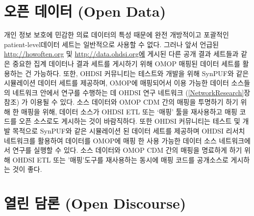 \documentclass[11pt]{book}
\theoremstyle{definition}
\theoremstyle{definition}
\theoremstyle{definition}
\theoremstyle{remark}
\begin{document}
\section{오픈 데이터 (Open Data)}\label{--open-data}


개인 정보 보호에 민감한 의료 데이터의 특성 때문에 완전 개방적이고
포괄적인 patient-level데이터 세트는 일반적으로 사용할 수 없다. 그러나
앞서 언급된 \url{http://howoften.org} 및 \url{http://data.ohdsi.org에}
게시된 다른 공개 결과 세트들과 같은 중요한 집계 데이터나 결과 세트를
게시하기 위해 OMOP 매핑된 데이터 세트를 활용하는 건 가능하다. 또한,
OHDSI 커뮤니티는 테스트와 개발을 위해 SynPUF와 같은 시뮬레이션 데이터
세트를 제공하며, OMOP에 매핑되어서 이용 가능한 데이터 소스들의 네트워크
안에서 연구를 수행하는 데 OHDSI 연구 네트워크 (\ref{NetworkResearch}장
참조) 가 이용될 수 있다. 소스 데이터와 OMOP CDM 간의 매핑을 투명하기
하기 위해 한 매핑을 위해, 데이터 소스가 OHDSI ETL 또는 `매핑' 툴을
재사용하고 매핑 코드를 오픈 소스로도 게시하는 것이 바람직하다. 또한
OHDSI 커뮤니티는 테스트 및 개발 목적으로 SynPUF와 같은 시뮬레이션 된
데이터 세트를 제공하며 OHDSI 리서치 네트워크를 활용하여 데이터를 OMOP에
매핑 한 사용 가능한 데이터 소스 네트워크에서 연구를 실행할 수 있다. 소스
데이터와 OMOP CDM 간의 매핑을 명료하게 하기 위해 OHDSI ETL 또는
'매핑'도구를 재사용하는 동시에 매핑 코드를 공개소스로 게시하는 것이
좋다.

\section{열린 담론 (Open Discourse)}\label{--open-discourse}

\end{document}
